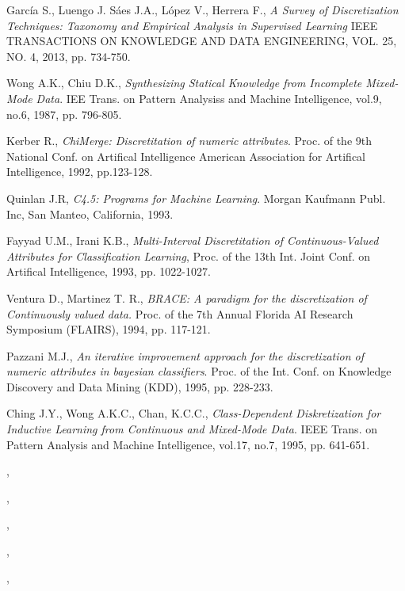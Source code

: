\begin{thebibliography}{}
 García S., Luengo J. Sáes J.A., López V., Herrera F., \textit{ A Survey of Discretization Techniques: 	Taxonomy and Empirical Analysis	in Supervised Learning }
IEEE TRANSACTIONS ON KNOWLEDGE AND DATA ENGINEERING, VOL. 25, NO. 4, 2013, pp. 734-750.




Wong A.K., Chiu D.K., {\it Synthesizing Statical Knowledge from Incomplete Mixed-Mode Data}. IEE Trans. on Pattern Analysiss and Machine Intelligence, vol.9, no.6, 1987, pp. 796-805. 

Kerber R., {\it ChiMerge: Discretitation of numeric attributes}. Proc. of the 9th National Conf. on Artifical Intelligence American Association for Artifical Intelligence, 1992, pp.123-128. 

Quinlan J.R, {\it C4.5: Programs for Machine Learning}. Morgan Kaufmann Publ. Inc, San Manteo, California, 1993. 


Fayyad U.M., Irani K.B., {\it Multi-Interval Discretitation of Continuous-Valued Attributes for Classification Learning}, 
Proc. of the 13th Int. Joint Conf. on Artifical Intelligence, 1993, pp. 1022-1027. 


Ventura D., Martinez T. R., {\it BRACE: A paradigm for the discretization of Continuously valued data. } 
Proc. of the 7th Annual Florida AI Research Symposium (FLAIRS), 1994, pp. 117-121. 


Pazzani M.J., {\it An iterative improvement approach for the discretization of numeric attributes in bayesian classifiers}.
Proc. of the Int. Conf. on Knowledge Discovery and Data Mining (KDD), 1995, pp. 228-233. 


Ching J.Y., Wong A.K.C., Chan, K.C.C., {\it Class-Dependent Diskretization for Inductive Learning from Continuous and Mixed-Mode Data}.
IEEE Trans. on Pattern Analysis and Machine Intelligence, vol.17, no.7, 1995, pp. 641-651.


, {\it  }


, {\it  }


, {\it  }


, {\it  }


, {\it  }



\end{thebibliography}
